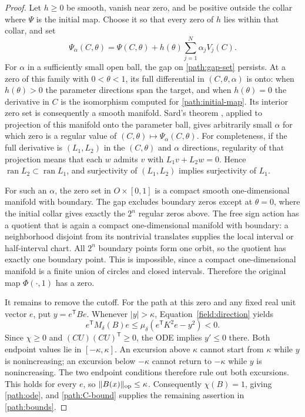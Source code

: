 \begin{proof}
Let $h\geq0$ be smooth, vanish near zero, and be positive outside
the collar where $\Psi$ is the initial map.  Choose it so that
every zero of $h$ lies within that collar, and set
\[
       \Psi_\alpha(C,\theta)
           =\Psi(C,\theta)+h(\theta)\sum_{j=1}^{N}\alpha_jV_j(C).
\]
For $\alpha$ in a sufficiently small open ball, the gap on
\eqref{path:gap-set} persists.  At a zero of this family with
$0<\theta<1$, its full differential in $(C,\theta,\alpha)$
is onto: when $h(\theta)>0$ the parameter directions span the
target, and when $h(\theta)=0$ the derivative in $C$ is the
isomorphism computed for \eqref{path:initial-map}.
Its interior zero set is consequently a smooth manifold.
Sard's theorem \cite{Sard1942}, applied to projection of this
manifold onto the parameter ball, gives arbitrarily small
$\alpha$ for which zero is a regular value of
$(C,\theta)\mapsto\Psi_\alpha(C,\theta)$.
For completeness, if the full derivative is $(L_1,L_2)$ in
the $(C,\theta)$ and $\alpha$ directions, regularity of that
projection means that each $w$ admits $v$ with
$L_1v+L_2w=0$.  Hence $\operatorname{ran}L_2\subset
\operatorname{ran}L_1$, and surjectivity of $(L_1,L_2)$ implies
surjectivity of $L_1$.

For such an $\alpha$, the zero set in $O\times[0,1]$ is a
compact smooth one-dimensional manifold with boundary.  The gap
excludes boundary zeros except at $\theta=0$, where the initial
collar gives exactly the $2^n$ regular zeros above.  The free
sign action has a quotient that is again a compact
one-dimensional manifold with boundary: a neighborhood disjoint
from its nontrivial translates supplies the local interval or
half-interval chart.  All $2^n$ boundary points form one orbit,
so the quotient has exactly one boundary point.  This is
impossible, since a compact one-dimensional manifold is a finite
union of circles and closed intervals.  Therefore the original
map $\Phi(\cdot,1)$ has a zero.

It remains to remove the cutoff.  For the path at this zero and
any fixed real unit vector $e$, put $y=e^{\mathsf T}Be$.
Whenever $|y|>\kappa$, Equation~\eqref{field:direction} yields
\[
 e^{\mathsf T}M_\delta(B)e
       \leq\mu_\delta(e^{\mathsf T}K^2e-y^2)<0.
\]
Since $\chi\geq0$ and $(CU)(CU)^{\mathsf T}\geq0$, the ODE
implies $y'\leq0$ there.  Both endpoint values lie in
$[-\kappa,\kappa]$.  An excursion above $\kappa$ cannot start
from $\kappa$ while $y$ is nonincreasing; an excursion below
$-\kappa$ cannot return to $-\kappa$ while $y$ is nonincreasing.
The two endpoint conditions therefore rule out both excursions.
This holds for every $e$, so $\|B(x)\|_{\operatorname{op}}\leq\kappa$.
Consequently $\chi(B)=1$, giving \eqref{path:ode}, and
\eqref{path:C-bound} supplies the remaining assertion in
\eqref{path:bounds}.
\end{proof}
